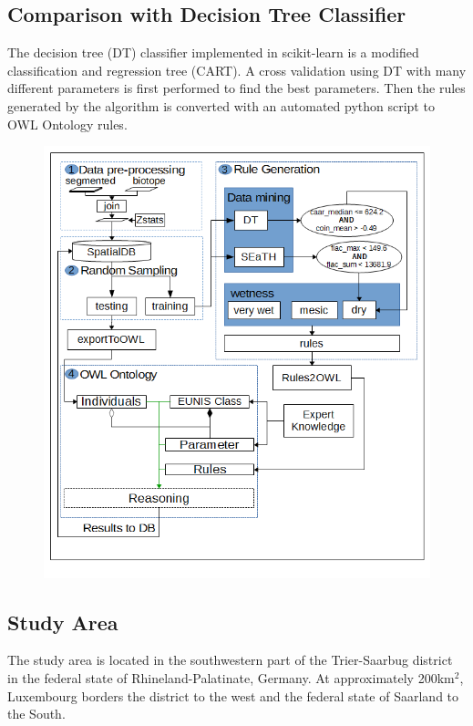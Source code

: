 \documentclass[authoryear, review,12pt,number]{elsarticle}
\begin{document}
\subsection{Comparison with Decision Tree Classifier}
The decision tree (DT) classifier implemented in scikit-learn is a modified
classification and regression tree (CART)\citep{scikit-learn}. A cross
validation using DT with many different parameters is first performed to find the best
parameters. Then the rules generated by the algorithm is converted with an
automated python script to OWL Ontology rules.
\begin{figure}
	\includegraphics{diagrams/another_workflow_diagram_large.png}
\end{figure}

%

\subsection{Study Area}
The study area is located in the southwestern part of the Trier-Saarbug district
in the federal state of Rhineland-Palatinate, Germany. At approximately
200km$^{2}$, Luxembourg borders the district to the west and the federal state
of Saarland to the South.
\end{document}
